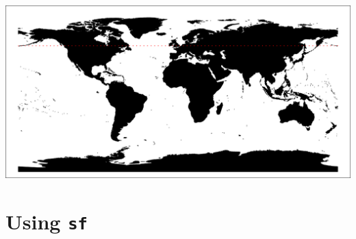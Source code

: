 \documentclass[11pt,ignorenonframetext,]{beamer}
\begin{document}
\begin{frame}{}
\protect\hypertarget{section-1}{}

\begin{center}\includegraphics[width=\textwidth]{Lec15_files/figure-beamer/unnamed-chunk-13-1} \end{center}

\end{frame}

\hypertarget{using-sf}{%
\section{\texorpdfstring{Using \texttt{sf}}{Using sf}}\label{using-sf}}
\end{document}
